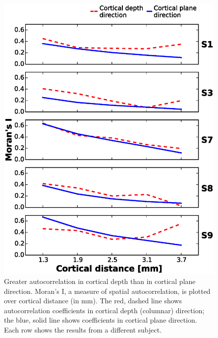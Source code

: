 \begin{figure}[htbp!]
\centering
\includegraphics[width=\textwidth]{figures/chapter_03_SI/figS10.eps}
\caption{Greater autocorrelation in cortical depth than in cortical plane direction. Moran's I, a measure of spatial autocorrelation, is plotted over cortical distance (in mm). The red, dashed line shows autocorrelation coefficients in cortical depth (columnar) direction; the blue, solid line shows coefficients in cortical plane direction. Each row shows the results from a different subject.}
\label{fig:figJ_autoCorr}
\end{figure}

